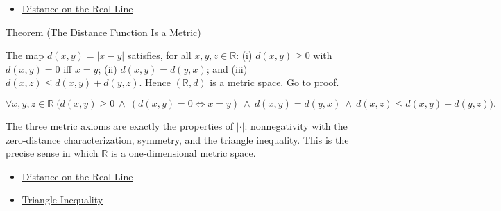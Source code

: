 \begin{dependencies}
\begin{itemize}
  \item \hyperref[def:distance-on-real-line]{Distance on the Real Line}
\end{itemize}
\end{dependencies}
\begin{theorembox}{Theorem (The Distance Function Is a Metric)}
\begin{theorem}
\label{thm:distance-is-a-metric}
The map $d(x,y)=|x-y|$ satisfies, for all $x,y,z\in\mathbb{R}$: (i) $d(x,y)\ge 0$ with $d(x,y)=0$ iff $x=y$; (ii) $d(x,y)=d(y,x)$; and (iii) $d(x,z)\le d(x,y)+d(y,z)$. Hence $(\mathbb{R},d)$ is a metric space.
\hyperref[prf:distance-is-a-metric]{Go to proof.}
\end{theorem}
\end{theorembox}
\begin{remark*}
\[
\forall x,y,z\in\mathbb{R}\;\bigl(d(x,y)\ge 0\ \land\ (d(x,y)=0\Leftrightarrow x=y)\ \land\ d(x,y)=d(y,x)\ \land\ d(x,z)\le d(x,y)+d(y,z)\bigr).
\]
\end{remark*}
\begin{remark*}[Interpretation]
The three metric axioms are exactly the properties of $|\cdot|$: nonnegativity with the zero-distance characterization, symmetry, and the triangle inequality. This is the precise sense in which $\mathbb{R}$ is a one-dimensional metric space.
\end{remark*}
\begin{dependencies}
\begin{itemize}
  \item \hyperref[def:distance-on-real-line]{Distance on the Real Line}
  \item \hyperref[thm:triangle-inequality]{Triangle Inequality}
\end{itemize}
\end{dependencies}
